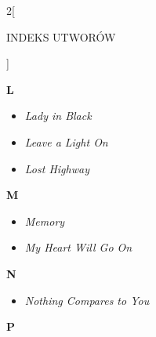 \documentclass[a4paper]{report}
\begin{document}
\begin{multicols*}{2}[\begin{Huge}INDEKS UTWORÓW\end{Huge}\vspace{1cm}]
\begin{minipage}{\columnwidth}
\begin{itemize}[topsep=6pt, after=\vspace{5mm}, leftmargin=0mm]
	\end{itemize}
\end{minipage}
\begin{minipage}{\columnwidth}
\begin{Large}
		\textbf{L}
	\end{Large} 
	\begin{itemize}[topsep=6pt, after=\vspace{5mm}, leftmargin=0mm]
		\itemsep0em
		\item[]\textit{Lady in Black}  \\
		\item[]  \textit{Leave a Light On}  \\
		\item[]  \textit{Lost Highway}  \\
	\end{itemize}
\end{minipage}
\begin{minipage}{\columnwidth}
\begin{Large}
		\textbf{M}
	\end{Large} 
	\begin{itemize}[topsep=6pt, after=\vspace{5mm}, leftmargin=0mm]
		\itemsep0em
		\item[]\textit{Memory}  \\
		\item[]  \textit{My Heart Will Go On}  \\
	\end{itemize}
\end{minipage}
\begin{minipage}{\columnwidth}
\begin{Large}
		\textbf{N}
	\end{Large} 
	\begin{itemize}[topsep=6pt, after=\vspace{5mm}, leftmargin=0mm]
		\itemsep0em
		\item[]\textit{Nothing Compares to You}  \\
	\end{itemize}
\end{minipage}
\begin{minipage}{\columnwidth}
\begin{Large}
		\textbf{P}
	\end{Large} 
	\begin{itemize}[topsep=6pt, after=\vspace{5mm}, leftmargin=0mm]

\end{itemize}
\end{minipage}
\end{multicols*}
\end{document}
